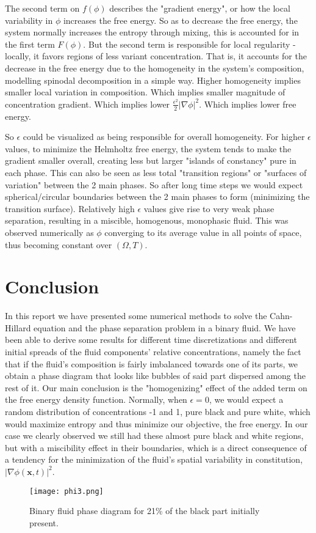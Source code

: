 \documentclass[11pt,a4paper]{report}
\begin{document}
The second term on $f(\phi)$ describes the "gradient energy", or how the local variability in $\phi$ increases the free energy.
So as to decrease the free energy, the system normally increases the entropy through mixing, this is accounted for in the first term $F(\phi)$.
But the second term is responsible for local regularity - locally, it favors regions of less variant concentration.
That is, it accounts for the decrease in the free energy due to the homogeneity in the system's composition, modelling spinodal decomposition in a simple way.
Higher homogeneity implies smaller local variation in composition.
Which implies smaller magnitude of concentration gradient.
Which implies lower $\frac{\epsilon^2}{2}|\nabla{\phi}|^2$.
Which implies lower free energy.

So $\epsilon$ could be visualized as being responsible for overall homogeneity.
For higher $\epsilon$ values, to minimize the Helmholtz free energy, the system tends to make the gradient smaller overall, creating less but larger "islands of constancy" pure in each phase.
This can also be seen as less total "transition regions" or "surfaces of variation" between the 2 main phases.
So after long time steps we would expect spherical/circular boundaries between the 2 main phases to form (minimizing the transition surface).
Relatively high $\epsilon$ values give rise to very weak phase separation, resulting in a miscible, homogenous, monophasic fluid.
This was observed numerically as $\phi$ converging to its average value in all points of space,
thus becoming constant over $(\Omega, T)$.

\chapter{Conclusion}

In this report we have presented some numerical methods to solve the Cahn-Hillard equation and the phase separation problem in a binary fluid. We have been able to derive some results for different time discretizations and different initial spreads of the fluid components' relative concentrations, namely the fact that if the fluid's composition is fairly imbalanced towards one of its parts, we obtain a phase diagram that looks like bubbles of said part dispersed among the rest of it.
Our main conclusion is the "homogenizing" effect of the added term on the free energy density function.
Normally, when $\epsilon=0$, we would expect a random distribution of concentrations -1 and 1, pure black and pure white, which would maximize entropy and thus minimize our objective, the free energy.
In our case we clearly observed we still had these almost pure black and white regions, but with a miscibility effect in their boundaries,
which is a direct consequence of a tendency for the minimization of the fluid's spatial variability in constitution, $|\nabla{\phi(\textbf{x}, t)}|^2$.



\begin{figure}[h!]
\centering
\texttt{[image: phi3.png]}
\caption{Binary fluid phase diagram for 21\% of the black part initially present.}
\end{figure}
\end{document}
